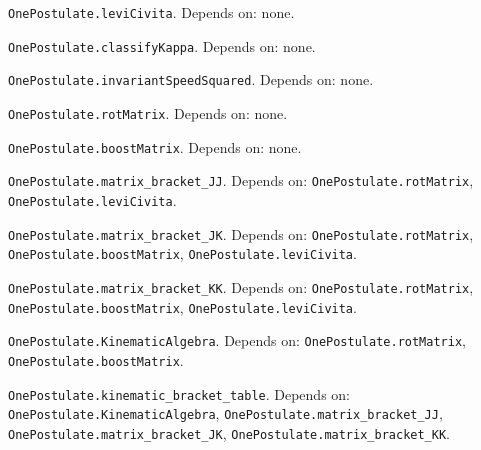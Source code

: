 \begin{definition}\label{OnePostulate.leviCivita}
\texttt{OnePostulate.leviCivita}. Depends on: none.
\end{definition}

\begin{definition}\label{OnePostulate.classifyKappa}
\texttt{OnePostulate.classifyKappa}. Depends on: none.
\end{definition}

\begin{definition}\label{OnePostulate.invariantSpeedSquared}
\texttt{OnePostulate.invariantSpeedSquared}. Depends on: none.
\end{definition}

\begin{definition}\label{OnePostulate.rotMatrix}
\texttt{OnePostulate.rotMatrix}. Depends on: none.
\end{definition}

\begin{definition}\label{OnePostulate.boostMatrix}
\texttt{OnePostulate.boostMatrix}. Depends on: none.
\end{definition}

\begin{lemma}\label{OnePostulate.matrix_bracket_JJ}
\texttt{OnePostulate.matrix\_bracket\_JJ}. Depends on: \texttt{OnePostulate.rotMatrix}, \texttt{OnePostulate.leviCivita}.
\end{lemma}

\begin{lemma}\label{OnePostulate.matrix_bracket_JK}
\texttt{OnePostulate.matrix\_bracket\_JK}. Depends on: \texttt{OnePostulate.rotMatrix}, \texttt{OnePostulate.boostMatrix}, \texttt{OnePostulate.leviCivita}.
\end{lemma}

\begin{lemma}\label{OnePostulate.matrix_bracket_KK}
\texttt{OnePostulate.matrix\_bracket\_KK}. Depends on: \texttt{OnePostulate.rotMatrix}, \texttt{OnePostulate.boostMatrix}, \texttt{OnePostulate.leviCivita}.
\end{lemma}

\begin{definition}\label{OnePostulate.KinematicAlgebra}
\texttt{OnePostulate.KinematicAlgebra}. Depends on: \texttt{OnePostulate.rotMatrix}, \texttt{OnePostulate.boostMatrix}.
\end{definition}

\begin{lemma}\label{OnePostulate.kinematic_bracket_table}
\texttt{OnePostulate.kinematic\_bracket\_table}. Depends on: \texttt{OnePostulate.KinematicAlgebra}, \texttt{OnePostulate.matrix\_bracket\_JJ}, \texttt{OnePostulate.matrix\_bracket\_JK}, \texttt{OnePostulate.matrix\_bracket\_KK}.
\end{lemma}

